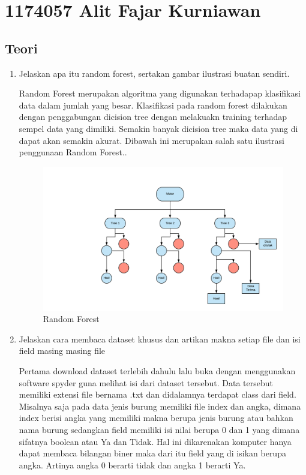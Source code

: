 \section{1174057 Alit Fajar Kurniawan}

\subsection{Teori}
\begin{enumerate}
\item Jelaskan apa itu random forest, sertakan gambar ilustrasi buatan sendiri.
\par
Random Forest merupakan algoritma yang digunakan terhadapap klasiﬁkasi data dalam jumlah yang besar. Klasiﬁkasi pada random forest dilakukan dengan penggabungan dicision tree dengan melakuakn training terhadap sempel data yang dimiliki. Semakin banyak dicision tree maka data yang di dapat akan semakin akurat. Dibawah ini merupakan salah satu ilustrasi penggunaan Random Forest..

\begin{figure}[ht]
\centering
\includegraphics[scale=0.5]{figures/1174057/chapter3/1.png}
\caption{Random Forest}
\label{contoh}
\end{figure}


\item Jelaskan cara membaca dataset khusus dan artikan makna setiap file dan isi field masing masing file \par Pertama download dataset terlebih dahulu lalu buka dengan menggunakan software spyder guna melihat isi dari dataset tersebut. Data tersebut memiliki extensi ﬁle bernama .txt dan didalamnya terdapat class dari ﬁeld. Misalnya saja pada data jenis burung memiliki ﬁle index dan angka, dimana index berisi angka yang memiliki makna berupa jenis burung atau bahkan nama burung sedangkan ﬁeld memiliki isi nilai berupa 0 dan 1 yang dimana sifatnya boolean atau Ya dan Tidak. Hal ini dikarenakan komputer hanya dapat membaca bilangan biner maka dari itu ﬁeld yang di isikan berupa angka. Artinya angka 0 berarti tidak dan angka 1 berarti Ya.


\end{enumerate}
